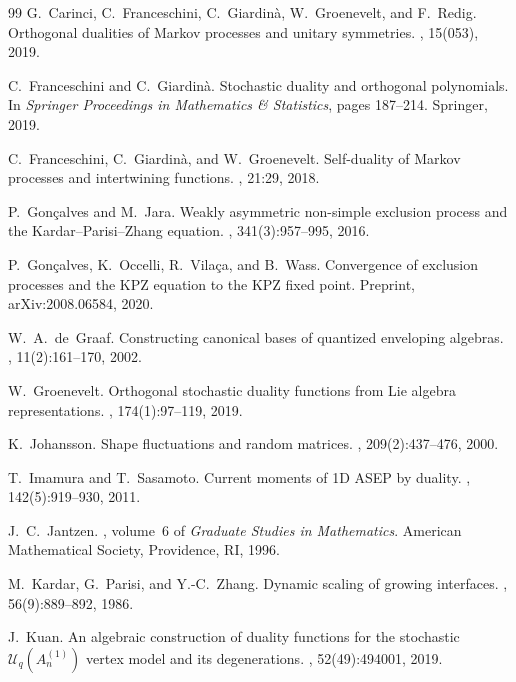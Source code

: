 \documentclass{ximera}
\begin{document}
\begin{thebibliography}{99}
G.~Carinci, C.~Franceschini, C.~Giardin\`{a}, W.~Groenevelt, and F.~Redig.
\newblock Orthogonal dualities of Markov processes and unitary symmetries.
, 15(053), 2019.

C.~Franceschini and C.~Giardin\`{a}.
\newblock Stochastic duality and orthogonal polynomials.
\newblock In {\em Springer Proceedings in Mathematics \& Statistics}, pages 187--214. Springer, 2019.

C.~Franceschini, C.~Giardin\`{a}, and W.~Groenevelt.
\newblock Self-duality of Markov processes and intertwining functions.
, 21:29, 2018.

P.~Gon\c{c}alves and M.~Jara.
\newblock Weakly asymmetric non-simple exclusion process and the Kardar--Parisi--Zhang equation.
, 341(3):957--995, 2016.

P.~Gon\c{c}alves, K.~Occelli, R.~Vila\c{c}a, and B.~Wass.
\newblock Convergence of exclusion processes and the KPZ equation to the KPZ fixed point.
\newblock Preprint, arXiv:2008.06584, 2020.

W.~A.~de~Graaf.
\newblock Constructing canonical bases of quantized enveloping algebras.
, 11(2):161--170, 2002.

W.~Groenevelt.
\newblock Orthogonal stochastic duality functions from Lie algebra representations.
, 174(1):97--119, 2019.

K.~Johansson.
\newblock Shape fluctuations and random matrices.
, 209(2):437--476, 2000.

T.~Imamura and T.~Sasamoto.
\newblock Current moments of 1D ASEP by duality.
, 142(5):919--930, 2011.

J.~C.~Jantzen.
, volume~6 of {\em Graduate Studies in Mathematics}.
\newblock American Mathematical Society, Providence, RI, 1996.

M.~Kardar, G.~Parisi, and Y.-C.~Zhang.
\newblock Dynamic scaling of growing interfaces.
, 56(9):889--892, 1986.

J.~Kuan.
\newblock An algebraic construction of duality functions for the stochastic $\mathcal{U}_q(A_n^{(1)})$ vertex model and its degenerations.
, 52(49):494001, 2019.


\end{thebibliography}
\end{document}
